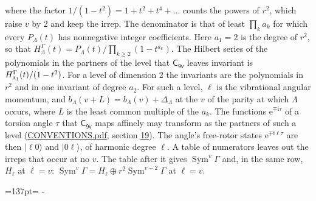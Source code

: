 \documentclass[10pt,a4paper]{article}
\newcommand{\needspace}[1]{\par\penalty-100\begingroup\dimen0=#1\relax\dimen2=\pagegoal
  \advance\dimen2-\pagetotal\ifdim\dimen0>\dimen2\relax\ifdim\dimen2>0pt\vfil\break\fi\fi
  \endgroup}
\numberwithin{equation}{section}
\newcommand{\grp}[1]{\mathsf{#1}}
\newcommand{\irr}[1]{\text{\normalfont\scshape #1}}
\newcommand{\iunit}{\mathrm{i}}
\newcommand{\expe}{\mathrm{e}}
\newcommand{\occ}[1]{\lvert #1\rangle}
\begin{document}
where the factor $1/(1 - t^2) = 1 + t^2 + t^4 + \dots$ counts the powers of $r^2$, which raise $v$ by 2 and keep the irrep. The denominator is that of least $\prod_k a_k$ for which every $P_\Lambda(t)$ has nonnegative integer coefficients. Here $a_1 = 2$ is the degree of $r^2$, so that $H^{\Gamma}_\Lambda(t) = P_\Lambda(t)/\prod_{k\ge2}(1 - t^{a_k})$. The Hilbert series of the polynomials in the partners of the level that $\grp{C_{9v}}$ leaves invariant is $H^{\Gamma}_{\irr{a}_{1}}(t)/(1 - t^2)$. For a level of dimension 2 the invariants are the polynomials in $r^2$ and in one invariant of degree $a_2$. \label{n:index.overtone.period}\label{n:index.increment.unitary}For such a level, $\ell$ is the vibrational angular momentum, and $b_\Lambda(v + L) = b_\Lambda(v) + \Delta_\Lambda$ at the $v$ of the parity at which $\Lambda$ occurs, where $L$ is the least common multiple of the $a_k$. \label{n:local.torsion.angle}The functions $\expe^{\mp\iunit\tau}$ of a torsion angle $\tau$ that $\grp{C_{9v}}$ maps affinely may transform as the partners of such a level (\href{../../CONVENTIONS.pdf}{CONVENTIONS.pdf}, section \href{../../CONVENTIONS.pdf\#conv.19}{19}). The angle's free-rotor states $\expe^{\mp\iunit\ell\tau}$ are then $\occ{\ell 0}$ and $\occ{0 \ell}$, of harmonic degree $\ell$. A table of numerators leaves out the irreps that occur at no $v$. The table after it gives $\operatorname{Sym}^{v}\Gamma$ and, in the same row, $H_\ell$ at $\ell = v$: $\operatorname{Sym}^{v}\Gamma = H_\ell \oplus r^2\operatorname{Sym}^{v-2}\Gamma$ at $\ell = v$.
\needspace{137pt}
\end{document}
